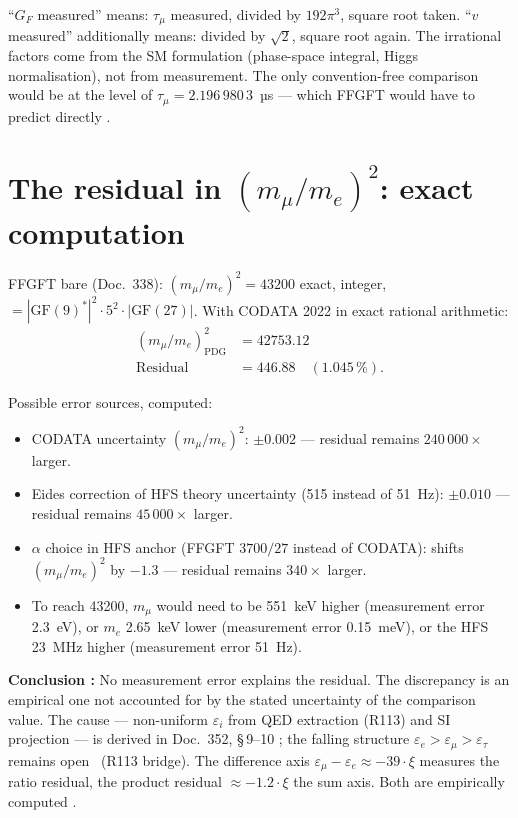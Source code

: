 ``$G_F$ measured'' means: $\tau_\mu$ measured, divided by $192\pi^3$, square root taken. ``$v$ measured'' additionally means: divided by $\sqrt2$, square root again. The irrational factors come from the SM formulation (phase-space integral, Higgs normalisation), not from measurement. The only convention-free comparison would be at the level of $\tau_\mu=2.196\,980\,3$~µs --- which FFGFT would have to predict directly \SM.

\section{The residual in $(m_\mu/m_e)^2$: exact computation}

FFGFT bare (Doc.~338): $(m_\mu/m_e)^2=43200$ exact, integer,
$=|\text{GF}(9)^*|^2\cdot5^2\cdot|\text{GF}(27)|$. With CODATA 2022
in exact rational arithmetic:
\begin{align}
(m_\mu/m_e)^2_\text{PDG} &= 42753.12 \\
\text{Residual} &= 446.88\quad(1.045\,\%) .
\end{align}

Possible error sources, computed:
\begin{itemize}\itemsep2pt
\item CODATA uncertainty $(m_\mu/m_e)^2$: $\pm0.002$ --- residual
  remains $240\,000\times$ larger.
\item Eides correction of HFS theory uncertainty (515 instead of 51~Hz):
  $\pm0.010$ --- residual remains $45\,000\times$ larger.
\item $\alpha$ choice in HFS anchor (FFGFT $3700/27$ instead of CODATA):
  shifts $(m_\mu/m_e)^2$ by $-1.3$ --- residual remains
  $340\times$ larger.
\item To reach 43200, $m_\mu$ would need to be 551~keV higher
  (measurement error 2.3~eV), or $m_e$ 2.65~keV lower
  (measurement error 0.15~meV), or the HFS 23~MHz higher
  (measurement error 51~Hz).
\end{itemize}

\textbf{Conclusion \BM:} No measurement error explains the residual.
The discrepancy is an empirical one not accounted for by the stated uncertainty of the comparison value. The cause --- non-uniform $\varepsilon_i$ from QED extraction (R113) and SI projection --- is derived in Doc.~352, §\,9--10 \KM; the falling structure $\varepsilon_e > \varepsilon_\mu > \varepsilon_\tau$ remains open \SM\ (R113 bridge).
The difference axis $\varepsilon_\mu-\varepsilon_e\approx-39\cdot\xi$
measures the ratio residual, the product residual $\approx-1.2\cdot\xi$
the sum axis. Both are empirically computed \KM.

